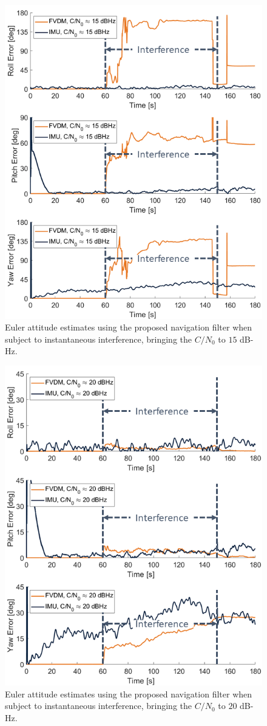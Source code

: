 \begin{figure}[!ht]
    \centering
    \includegraphics[width=0.75\linewidth]{Figures/Results/trajectoryfigure/Slide2.PNG}
    \caption{Euler attitude estimates using the proposed navigation filter when subject to instantaneous interference, bringing the \(C/N_0\) to \(15\) dB-Hz.}\label{fig:Eul15}
\end{figure}

\begin{figure}[!ht]
    \centering
    \includegraphics[width=0.75\linewidth]{Figures/Results/trajectoryfigure/Slide3.PNG}
    \caption{Euler attitude estimates using the proposed navigation filter when subject to instantaneous interference, bringing the \(C/N_0\) to \(20\) dB-Hz.}\label{fig:Eul20}
\end{figure}

